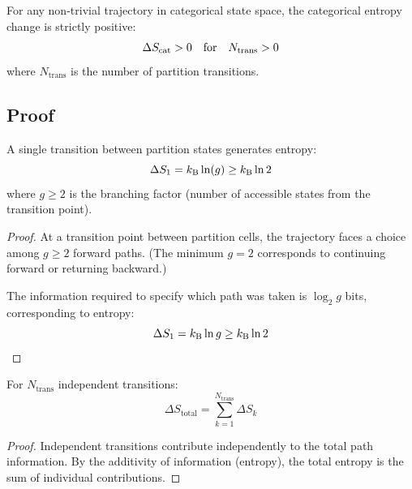 \begin{theorem}
\label{thm:second_law}
For any non-trivial trajectory in categorical state space, the categorical entropy change is strictly positive:
\begin{equation}
\Delta S_{\mathrm{cat}} > 0 \quad \text{for} \quad N_{\text{trans}} > 0
\label{eq:second_law}
\end{equation}
where $N_{\text{trans}}$ is the number of partition transitions.
\end{theorem}

\subsection{Proof}

\begin{lemma}
\label{lem:single_transition}
A single transition between partition states generates entropy:
\begin{equation}
\Delta S_1 = k_{\mathrm{B}} \ln(g) \geq k_{\mathrm{B}} \ln 2
\label{eq:single_entropy}
\end{equation}
where $g \geq 2$ is the branching factor (number of accessible states from the transition point).
\end{lemma}

\begin{proof}
At a transition point between partition cells, the trajectory faces a choice among $g \geq 2$ forward paths. (The minimum $g = 2$ corresponds to continuing forward or returning backward.)

The information required to specify which path was taken is $\log_2 g$ bits, corresponding to entropy:
\begin{equation}
\Delta S_1 = k_{\mathrm{B}} \ln g \geq k_{\mathrm{B}} \ln 2
\end{equation}
\end{proof}

\begin{lemma}
\label{lem:entropy_additivity}
For $N_{\text{trans}}$ independent transitions:
\begin{equation}
\Delta S_{\text{total}} = \sum_{k=1}^{N_{\text{trans}}} \Delta S_k
\end{equation}
\end{lemma}

\begin{proof}
Independent transitions contribute independently to the total path information. By the additivity of information (entropy), the total entropy is the sum of individual contributions.
\end{proof}

